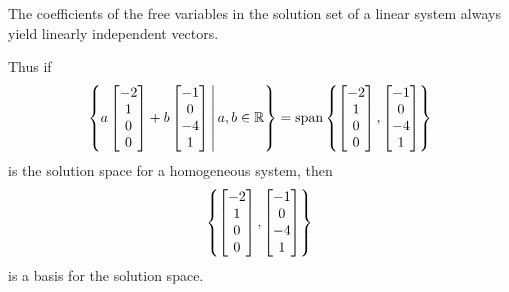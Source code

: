 \begin{fact}
  The coefficients of the free variables in the solution set of a linear system
  always yield linearly independent vectors.

  \vspace{1em}

  Thus if
  \[
    \left\{
      a \begin{bmatrix} -2 \\ 1 \\ 0 \\ 0\end{bmatrix} +
      b \begin{bmatrix} -1 \\ 0 \\ -4 \\ 1 \end{bmatrix}
    \,\middle|\,
      a,b \in \mathbb{R}
    \right\} = \operatorname{span}\left\{ \begin{bmatrix} -2 \\ 1 \\ 0 \\ 0\end{bmatrix}, 
					 \begin{bmatrix} -1 \\ 0 \\ -4 \\ 1 \end{bmatrix} \right\}
  \]
  is the solution space for a homogeneous system, then
  \[
    \left\{
      \begin{bmatrix} -2 \\ 1 \\ 0 \\ 0\end{bmatrix},
      \begin{bmatrix} -1 \\ 0 \\ -4 \\ 1 \end{bmatrix}
    \right\}
  \]
  is a basis for the solution space.
\end{fact}

